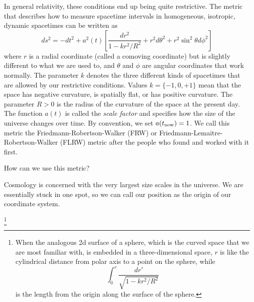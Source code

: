 In general relativity, these conditions end up being quite restrictive.  The metric that describes how to measure spacetime intervals in homogeneous, isotropic, dynamic spacetimes can be written as
\begin{equation}
  ds^2 = -dt^2 + a^2(t)\left[ \frac{dr^2}{1 - kr^2/R^2} + r^2 d\theta^2 + r^2 \sin^2\theta d\phi^2  \right]
\end{equation}
where $r$ is a radial coordinate (called a comoving coordinate) but is slightly different to what we are used to, and $\theta$ and $\phi$ are angular coordinates that work normally.  The parameter $k$ denotes the three different kinds of spacetimes that are allowed by our restrictive conditions.  Values $k = \{ -1, 0, +1 \}$ mean that the space has negative curvature, is spatially flat, or has positive curvature.  The parameter $R > 0$ is the radius of the curvature of the space at the present day.  The function $a(t)$ is called the \textit{scale factor} and specifies how the size of the universe changes over time.  By convention, we set $a(t_{\rm now}) = 1$.  We call this metric the Friedmann-Robertson-Walker (FRW) or Friedmann-Lemaitre-Robertson-Walker (FLRW) metric after the people who found and worked with it first.

How can we use this metric?  

Cosmology is concerned with the very largest size scales in the universe.  We are essentially stuck in one spot, so we can call our position as the origin of our coordinate system. 


\footnote{When the analogous 2d surface of a sphere, which is the curved space that we are most familiar with, is embedded in a three-dimensional space, $r$ is like the cylindrical distance from polar axis to a point on the sphere, while \begin{equation} \int_0^r \frac{dr'}{\sqrt{1-kr^2/R^2}} \end{equation} is the length from the origin along the surface of the sphere.}
